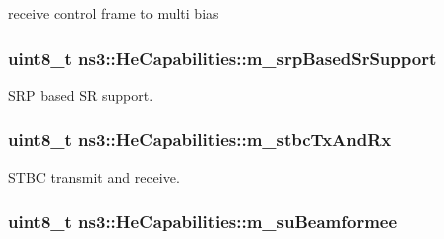 receive control frame to multi bias 

\subsubsection[{\texorpdfstring{m\+\_\+srp\+Based\+Sr\+Support}{m_srpBasedSrSupport}}]{\setlength{\rightskip}{0pt plus 5cm}uint8\+\_\+t ns3\+::\+He\+Capabilities\+::m\+\_\+srp\+Based\+Sr\+Support\hspace{0.3cm}{\ttfamily [private]}}\hypertarget{classns3_1_1HeCapabilities_a2abcfc2454d3507833dcef612610b48b}{}\label{classns3_1_1HeCapabilities_a2abcfc2454d3507833dcef612610b48b}


S\+RP based SR support. 

\subsubsection[{\texorpdfstring{m\+\_\+stbc\+Tx\+And\+Rx}{m_stbcTxAndRx}}]{\setlength{\rightskip}{0pt plus 5cm}uint8\+\_\+t ns3\+::\+He\+Capabilities\+::m\+\_\+stbc\+Tx\+And\+Rx\hspace{0.3cm}{\ttfamily [private]}}\hypertarget{classns3_1_1HeCapabilities_a8aab94e87c6737a9c43b8d08dfdcd93b}{}\label{classns3_1_1HeCapabilities_a8aab94e87c6737a9c43b8d08dfdcd93b}


S\+T\+BC transmit and receive. 

\subsubsection[{\texorpdfstring{m\+\_\+su\+Beamformee}{m_suBeamformee}}]{\setlength{\rightskip}{0pt plus 5cm}uint8\+\_\+t ns3\+::\+He\+Capabilities\+::m\+\_\+su\+Beamformee\hspace{0.3cm}{\ttfamily [private]}}\hypertarget{classns3_1_1HeCapabilities_a68f6c78532eaaec71445fa9d1bb86f1b}{}\label{classns3_1_1HeCapabilities_a68f6c78532eaaec71445fa9d1bb86f1b}


